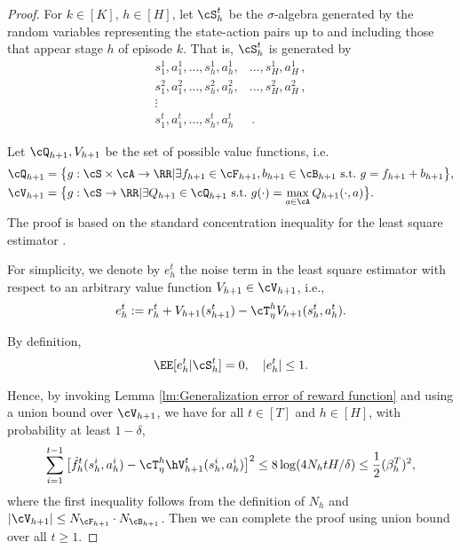 \documentclass[11pt]{article}
\begin{document}
\begin{proof}
For $k \in [K]$, $h \in [H]$, let $\cS^t_h$ be the $\sigma$-algebra generated by the random variables representing the state-action pairs up to and including those that appear stage $h$ of episode $k$. That is, $\cS^t_h$ is generated by
\begin{align*}
s_1^1,a_1^1, \dots, s_h^1,a_h^1, &\dots, s_H^1,a_H^1\,, \\
s_1^2,a_1^2, \dots, s_h^2,a_h^2, &\dots, s_H^2,a_H^2\,, \\
\vdots \\
s_1^t,a_1^t,\dots, s_h^t,a_h^t & \,.
\end{align*}

    Let $\cQ_{h + 1}, V_{h + 1}$ be the set of possible value functions, i.e. \begin{align*}
        &\cQ_{h + 1} = \big\{g: \cS \times \cA \to \RR | \exists f_{h + 1} \in \cF_{h + 1}, b_{h + 1} \in \cB_{h + 1}\ \mathrm{s.t.}\  g = f_{h + 1} + b_{h + 1}\big\}, \\
        &\cV_{h + 1} = \big\{g: \cS \to \RR | \exists Q_{h + 1} \in \cQ_{h + 1} \ \mathrm{s.t.}\ g(\cdot) = \max_{a \in \cA} Q_{h + 1}(\cdot, a)\big\}.
    \end{align*}
    The proof is based on the standard concentration inequality for the least square estimator \citep{zhang2023mathematical}.

    For simplicity, we denote by $e_h^t$ the noise term in the least square estimator with respect to an arbitrary value function $V_{h + 1} \in \cV_{h + 1}$, i.e., \begin{align*} 
        e_h^t := r_h^t + V_{h+1}(s_{h + 1}^t) - \cT_\eta^h V_{h+1}(s_h^t, a_h^t).
    \end{align*}

    By definition, \begin{align*}
        \EE[e_h^t | \cS^t_h] = 0, \quad| e_h^t | \le 1.
    \end{align*}

    Hence, by invoking Lemma \ref{lm:Generalization error of reward function} and using a union bound over $\cV_{h + 1}$, we have for all $t\in[T]$ and $h\in[H]$, with probability at least $1 - \delta$,
    \begin{align} \label{eq:aac}
        \sum_{i = 1}^{t - 1} \big[\hat f^t_h (s_h^i, a_h^i) - \cT_\eta^h \hV^t_{h+1}(s_h^i, a_h^i)\big]^2 \le 8 \log(4N_h t H / \delta) \le \frac{1}{2}(\beta^T_h)^2,
    \end{align} where the first inequality follows from the definition of $N_h$ and $|\cV_{h + 1}| \le N_{\cF_{h+1}} \cdot N_{\cB_{h + 1}}$.
    Then we can complete the proof using union bound over all $t \ge 1$.


\end{proof}
\end{document}
